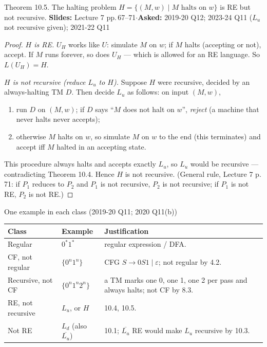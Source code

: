 \documentclass[10.5pt,a4paper]{article}
\newcommand{\src}[2]{{\footnotesize\color{gray!70!black}\textbf{Slides:} #1\enspace$\cdot$\enspace\textbf{Asked:} #2}\par}
\newcommand{\eps}{\varepsilon}
\newcommand{\Ld}{L_d}
\newcommand{\Lu}{L_u}
\begin{document}
\begin{thm}{Theorem 10.5. The halting problem $H=\{(M,w)\mid M \text{ halts on } w\}$ is RE but not recursive.}
\src{Lecture 7 pp.\,67--71}{2019-20 Q12; 2023-24 Q11 ($\Lu$ not recursive given); 2021-22 Q11}\end{thm}
\begin{proof}
\emph{$H$ is RE.} $U_H$ works like $U$: simulate $M$ on $w$; if $M$ halts (accepting or not), accept. If $M$ runs forever, so does $U_H$ --- which
is allowed for an RE language. So $L(U_H)=H$.

\emph{$H$ is not recursive (reduce $\Lu$ to $H$).} Suppose $H$ were recursive, decided by an always-halting TM $D$. Then decide $\Lu$ as follows:
on input $(M,w)$,
\begin{enumerate}
\item run $D$ on $(M,w)$; if $D$ says ``$M$ does not halt on $w$'', \emph{reject} (a machine that never halts never accepts);
\item otherwise $M$ halts on $w$, so simulate $M$ on $w$ to the end (this terminates) and accept iff $M$ halted in an accepting state.
\end{enumerate}
This procedure always halts and accepts exactly $\Lu$, so $\Lu$ would be recursive --- contradicting Theorem 10.4. Hence $H$ is not recursive.
(General rule, Lecture 7 p.\,71: if $P_1$ reduces to $P_2$ and $P_1$ is not recursive, $P_2$ is not recursive; if $P_1$ is not RE, $P_2$ is not RE.)
\end{proof}

\begin{ans}{One example in each class (2019-20 Q11; 2020 Q11(b))}
\begin{tabular}{@{}p{3.0cm}p{3.0cm}p{9.0cm}@{}}
\toprule
Class & Example & Justification\\\midrule
Regular & $0^*1^*$ & regular expression / DFA.\\
CF, not regular & $\{0^n1^n\}$ & CFG $S\to0S1\mid\eps$; not regular by 4.2.\\
Recursive, not CF & $\{0^n1^n2^n\}$ & a TM marks one 0, one 1, one 2 per pass and always halts; not CF by 8.3.\\
RE, not recursive & $\Lu$, or $H$ & 10.4, 10.5.\\
Not RE & $\Ld$ (also $\overline{\Lu}$) & 10.1; $\overline{\Lu}$ RE would make $\Lu$ recursive by 10.3.\\\bottomrule
\end{tabular}
\end{ans}
\end{document}
